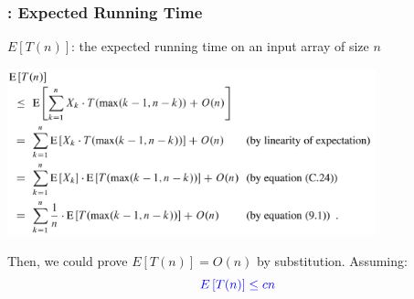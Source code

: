 \documentclass[UTF8,11pt,handout]{beamer}
\begin{document}
\begin{frame}
\frametitle{: Expected Running Time}

	\begin{block}{$E\left[ T(n)\right] $: the expected running time on an input array of size $n$}
		\begin{center}
		\includegraphics[width=0.8\textwidth]{figs/randomized-selection-expected-runtime-total.PNG}
		
	\pause	Then, we could prove $E\left[ T(n)\right]=O(n)$ by substitution. Assuming:
		\[
			{\color{blue} E\left[ T(n)\right]\le cn}
		\]
	
		\end{center}
	\end{block}
\end{frame}
\end{document}
